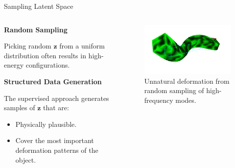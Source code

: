\documentclass{beamer}
\begin{document}
\begin{frame}{Sampling Latent Space}
    
    \begin{columns}[T]
        \begin{column}{0.5\textwidth}
            \textbf{Random Sampling}
            
            Picking random \(\mathbf{z}\) from a uniform distribution often results in high-energy configurations.

            \textbf{Structured Data Generation}
            
            The supervised approach generates samples of \(\mathbf{z}\) that are:
            \begin{itemize}
                \item Physically plausible.
                \item Cover the most important deformation patterns of the object.
            \end{itemize}
            

        \end{column}
        
        \begin{column}{0.5\textwidth}

            \begin{figure}
                \includegraphics[width=\textwidth]{Images/z_random.png}
                \caption{Unnatural deformation from random sampling of high-frequency modes.}
                \label{fig:bad_sampling}
            \end{figure}
           
        \end{column}
    \end{columns}

    
\end{frame}
\end{document}
